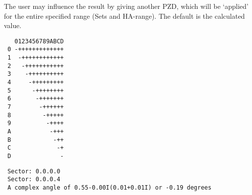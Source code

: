 The user may influence the result by giving another PZD, which will be
`applied' for the entire specified range (Sets and HA-range). The default is
the calculated value.

\spbegin %
\spend %
%
\spbegin %
\suser{\scr}
\spend %
%
\spbegin %
\suser{\scr}
\spend %
%
\spbegin %
\suser{\scr}
\spend %
%
\spbegin %
\sdefault{= *:}
\suser{\scr} %
\svbegin \begin{verbatim}
   0123456789ABCD
 0 -+++++++++++++
 1  -++++++++++++
 2   -+++++++++++
 3    -++++++++++
 4     -+++++++++
 5      -++++++++
 6       -+++++++
 7        -++++++
 8         -+++++
 9          -++++
 A           -+++
 B            -++
 C             -+
 D              -
\end{verbatim}\svend
\spend %
%
\spbegin %
\suser{\scr} %
\svbegin \begin{verbatim}
 Sector: 0.0.0.0
 Sector: 0.0.0.4
 A complex angle of 0.55-0.00I(0.01+0.01I) or -0.19 degrees
\end{verbatim}\svend
\spend %
%
\spbegin %
\suser{\scr}
\spend %

